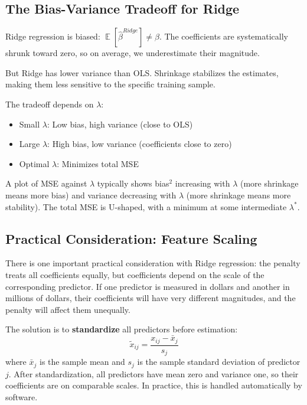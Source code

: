 \documentclass[11pt,a4paper]{article}
\DeclareMathOperator{\E}{\mathbb{E}}
\newcommand{\keyword}[1]{\textbf{\textcolor{AccentOrange}{#1}}}
\begin{document}
\subsection{The Bias-Variance Tradeoff for Ridge}

Ridge regression is biased: $\E[\widehat{\beta}^{Ridge}] \neq \beta$. The coefficients are systematically shrunk toward zero, so on average, we underestimate their magnitude.

But Ridge has lower variance than OLS. Shrinkage stabilizes the estimates, making them less sensitive to the specific training sample.

The tradeoff depends on $\lambda$:
\begin{itemize}
    \item Small $\lambda$: Low bias, high variance (close to OLS)
    \item Large $\lambda$: High bias, low variance (coefficients close to zero)
    \item Optimal $\lambda$: Minimizes total MSE
\end{itemize}

A plot of MSE against $\lambda$ typically shows bias$^2$ increasing with $\lambda$ (more shrinkage means more bias) and variance decreasing with $\lambda$ (more shrinkage means more stability). The total MSE is U-shaped, with a minimum at some intermediate $\lambda^*$.

\subsection{Practical Consideration: Feature Scaling}

There is one important practical consideration with Ridge regression: the penalty treats all coefficients equally, but coefficients depend on the scale of the corresponding predictor. If one predictor is measured in dollars and another in millions of dollars, their coefficients will have very different magnitudes, and the penalty will affect them unequally.

The solution is to \keyword{standardize} all predictors before estimation:
\[
\tilde{x}_{ij} = \frac{x_{ij} - \bar{x}_j}{s_j}
\]
where $\bar{x}_j$ is the sample mean and $s_j$ is the sample standard deviation of predictor $j$. After standardization, all predictors have mean zero and variance one, so their coefficients are on comparable scales. In practice, this is handled automatically by software.

\end{document}

